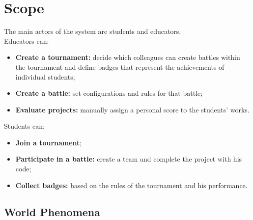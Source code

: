     \section{Scope}
The main actors of the system are students and educators. \\
Educators can:
\begin{itemize}
    \item \textbf{Create a tournament:} decide which colleagues can create battles within the tournament and define badges 
    that represent the achievements of individual students; 
    \item \textbf{Create a battle:} set configurations and rules for that battle;
    \item \textbf{Evaluate projects:} manually assign a personal score to the students' works.
\end{itemize}

Students can:
\begin{itemize}
    \item \textbf{Join a tournament};
    \item \textbf{Participate in a battle:} create a team and complete the project with his code;
    \item \textbf{Collect badges: } based on the rules of the tournament and his performance.
\end{itemize}

\subsection{World Phenomena}

\begin{table}[H]
    \centering
    \end{table}

